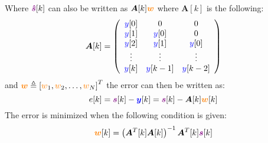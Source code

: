 Where $\boldsymbol{\textcolor{violet}{\hat{s}}}[k]$ can also be written as $\boldsymbol{A}[k] \boldsymbol{\textcolor{orange}{w}}$ where $\boldsymbol{A}[k]$ is the following:
$$
\boldsymbol{A}[k]=\left(\begin{array}{ccc}
\textcolor{blue}{y}[0] & 0 & 0 \\
\textcolor{blue}{y}[1] & \textcolor{blue}{y}[0] & 0 \\
\textcolor{blue}{y}[2] & \textcolor{blue}{y}[1] & \textcolor{blue}{y}[0] \\
\vdots & \vdots & \vdots \\
\textcolor{blue}{y}[k] & \textcolor{blue}{y}[k-1] & \textcolor{blue}{y}[k-2]
\end{array}\right)
$$
and $\boldsymbol{\textcolor{orange}{w}} \triangleq\left[\textcolor{orange}{w}_1, \textcolor{orange}{w}_2, \ldots, \textcolor{orange}{w}_N\right]^T$ the error can then be written as:
$$
e[k]=\boldsymbol{\textcolor{violet}{s}}[k]-\boldsymbol{\textcolor{blue}{y}}[k]=\boldsymbol{\textcolor{violet}{s}}[k]-\boldsymbol{A}[k] \boldsymbol{\textcolor{orange}{w}}[k]
$$
The error is minimized when the following condition is given:
$$
\boldsymbol{\textcolor{orange}{w}}[k]=\left(\boldsymbol{A}^T[k] \boldsymbol{A}[k]\right)^{-1} \boldsymbol{A}^T[k] \boldsymbol{\textcolor{violet}{s}}[k]
$$
